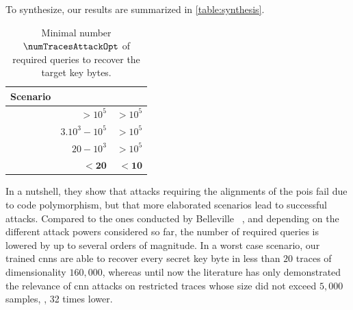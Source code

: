 To synthesize, our results are summarized in \autoref{table:synthesis}.
\begin{table}[t]
	\centering
	\caption{Minimal number \(\numTracesAttackOpt\) of required queries to recover the target key bytes.}
	\label{table:synthesis}
	\begin{tabular}{l r r}
		\toprule
		Scenario 		& \mbedTLS{} 		&  \aeshuitbit{}	\\
		\midrule
		\attLDADesync{} & \(> 10^5\) 		& \( > 10^5\) 		\\
		\midrule
		\attCPASync{} 	& \(3.10^3 - 10^5\) & \( > 10^5\)		\\
		\attLDASync{} 	& \(20 - 10^3\) 	& \( > 10^5\)		\\
		\attCNN{}	  	& \(\mathbf{< 20}\) & \(\mathbf{< 10}\) \\
		\bottomrule
	\end{tabular}
\end{table}
In a nutshell, they show that attacks requiring the alignments of the \glspl{poi} fail due to code polymorphism, but that more elaborated scenarios lead to successful attacks.
Compared to the ones conducted by Belleville \etal{}~\cite{belleville_automated_2019}, and depending on the different attack powers considered so far, the number of required queries is lowered by up to several orders of magnitude.
In a worst case scenario, our trained \glspl{cnn} are able to recover every secret key byte in less than \(20\) traces of dimensionality \(160,000\), whereas until now the literature has only demonstrated the relevance of \gls{cnn} attacks on restricted traces whose size did not exceed \(5,000\) samples, \ie{}, 32 times lower.